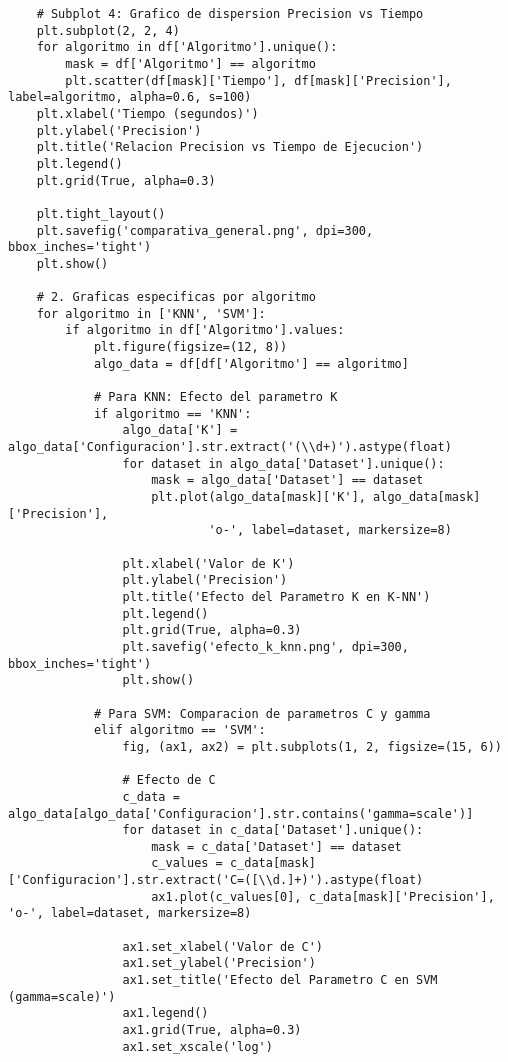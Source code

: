 \documentclass[12pt]{article}
\begin{document}
\begin{lstlisting}
    # Subplot 4: Grafico de dispersion Precision vs Tiempo
    plt.subplot(2, 2, 4)
    for algoritmo in df['Algoritmo'].unique():
        mask = df['Algoritmo'] == algoritmo
        plt.scatter(df[mask]['Tiempo'], df[mask]['Precision'], label=algoritmo, alpha=0.6, s=100)
    plt.xlabel('Tiempo (segundos)')
    plt.ylabel('Precision')
    plt.title('Relacion Precision vs Tiempo de Ejecucion')
    plt.legend()
    plt.grid(True, alpha=0.3)
    
    plt.tight_layout()
    plt.savefig('comparativa_general.png', dpi=300, bbox_inches='tight')
    plt.show()
    
    # 2. Graficas especificas por algoritmo
    for algoritmo in ['KNN', 'SVM']:
        if algoritmo in df['Algoritmo'].values:
            plt.figure(figsize=(12, 8))
            algo_data = df[df['Algoritmo'] == algoritmo]
            
            # Para KNN: Efecto del parametro K
            if algoritmo == 'KNN':
                algo_data['K'] = algo_data['Configuracion'].str.extract('(\\d+)').astype(float)
                for dataset in algo_data['Dataset'].unique():
                    mask = algo_data['Dataset'] == dataset
                    plt.plot(algo_data[mask]['K'], algo_data[mask]['Precision'], 
                            'o-', label=dataset, markersize=8)
                
                plt.xlabel('Valor de K')
                plt.ylabel('Precision')
                plt.title('Efecto del Parametro K en K-NN')
                plt.legend()
                plt.grid(True, alpha=0.3)
                plt.savefig('efecto_k_knn.png', dpi=300, bbox_inches='tight')
                plt.show()
            
            # Para SVM: Comparacion de parametros C y gamma
            elif algoritmo == 'SVM':
                fig, (ax1, ax2) = plt.subplots(1, 2, figsize=(15, 6))
                
                # Efecto de C
                c_data = algo_data[algo_data['Configuracion'].str.contains('gamma=scale')]
                for dataset in c_data['Dataset'].unique():
                    mask = c_data['Dataset'] == dataset
                    c_values = c_data[mask]['Configuracion'].str.extract('C=([\\d.]+)').astype(float)
                    ax1.plot(c_values[0], c_data[mask]['Precision'], 'o-', label=dataset, markersize=8)
                
                ax1.set_xlabel('Valor de C')
                ax1.set_ylabel('Precision')
                ax1.set_title('Efecto del Parametro C en SVM (gamma=scale)')
                ax1.legend()
                ax1.grid(True, alpha=0.3)
                ax1.set_xscale('log')
                

\end{lstlisting}
\end{document}
